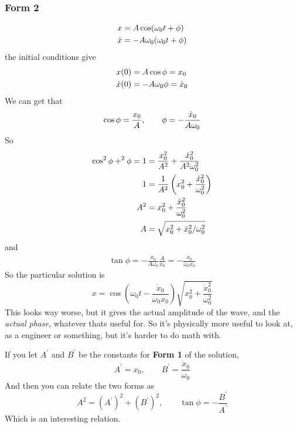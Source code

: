 \documentclass{article}
\let\sin\relax
\DeclareMathOperator{\sin}{\smash{\mathrm{sin}}}
\begin{document}
\subsubsection{Form 2}
\begin{align*}
    x &= A\cos(\omega_0t + \phi) \\ 
    \dot{x} &= -A\omega_0\sin(\omega_0t + \phi) 
\end{align*}
the initial conditions give
\begin{align*}
    x(0) &= A\cos\phi = x_0\\ 
    \dot{x}(0) &= -A\omega_0\sin\phi = \dot{x}_0
\end{align*}
We can get that 
\begin{equation*}
    \cos\phi = \frac{x_0}{A}, \qquad \sin\phi = -\frac{\dot{x}_0}{A\omega_0}
\end{equation*}
So 
\begin{align*}
    \cos^2\phi + \sin^2\phi = 1 &= \frac{x_0^2}{A^2} + \frac{\dot{x}_0^2}{A^2\omega_0^2} \\ 
    1 & = \frac{1}{A^2}\left(x_0^2 + \frac{\dot{x}_0^2}{\omega_0^2}\right) \\
    A^2 & = x_0^2 + \frac{\dot{x}_0^2}{\omega_0^2} \\ 
    A &= \sqrt{x_0^2 + \dot{x}_0^2/\omega_0^2}
\end{align*}
and
\begin{align*}
    \tan\phi = -\frac{\dot{x}_0}{A\omega_0} \frac{A}{x_0} = -\frac{\dot{x}_0}{\omega_0x_0}
\end{align*}
So the particular solution is
\begin{equation*}
    \boxed{x = \cos\!\left(\omega_0t -\frac{\dot{x}_0}{\omega_0x_0}\right)\sqrt{x_0^2 + \frac{\dot{x}_0^2}{\omega_0^2}}}
\end{equation*}
This looks way worse, but it gives the actual amplitude of the wave, and the \textit{actual phase}, whatever thats useful for. So it's physically more useful to look at, as a engineer or something, but it's harder to do math with.

If you let $A^\prime$ and $B^\prime$ be the constants for \textbf{Form 1} of the solution,
\begin{equation*}
    A^\prime = x_0, \qquad B^\prime = \frac{\dot{x}_0}{\omega_0}
\end{equation*}
And then you can relate the two forms as
\begin{equation*}
    A^2 = (A^\prime)^2 + (B^\prime)^2, \qquad \tan\phi = -\frac{B^\prime}{A^\prime}
\end{equation*}
Which is an interesting relation.
\end{document}
